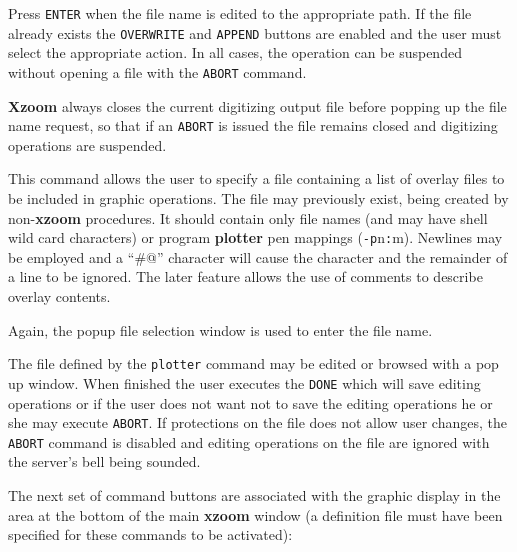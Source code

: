 \begin{description}
Press {\tt ENTER} when the file name is edited to the
appropriate path.
If the file already exists the {\tt OVERWRITE} and
{\tt APPEND} buttons are enabled and the user must select
the appropriate action.
In all cases, the operation can be suspended without opening
a file with the {\tt ABORT} command.

{\bf Xzoom} always closes the current digitizing output file before
popping up the file name request, so that if an {\tt ABORT}
is issued the file remains closed and digitizing operations
are suspended.
\item[\fbox{\tt plotter}]
This command allows the user to specify a file containing
a list of overlay files to be included in graphic operations.
The file may previously exist, being created by non-{\bf xzoom} procedures.
It should contain only file names (and may have shell wild card characters)
or program {\bf plotter} pen mappings ({\tt -p}n{\tt :}m).
Newlines may be employed and a ``\verb@#@''
character will cause the character and the remainder of a line to be ignored.
The later feature allows the use of comments to describe overlay contents.

Again, the popup file selection window is used to enter the file name.
\item[\fbox{\tt edit pl}]
The file defined by the {\tt plotter} command may be edited or browsed
with a pop up window.
When finished the user executes the {\tt DONE} which will save
editing operations or if the user does not want not to
save the editing operations he or she may execute {\tt ABORT}.
If protections on the file does not allow user changes, the {\tt ABORT}
command is disabled and editing operations on the file are ignored
with the server's bell being sounded.
\end{description}
The next set of command buttons are associated with the graphic
display in the area at the bottom of the main {\bf xzoom} window
(a definition file must have been specified for these commands
to be activated):
